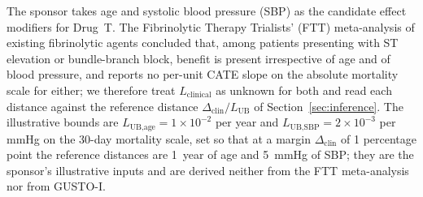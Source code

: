 \documentclass[AMA,Times1COL]{WileyNJDv5}
\begin{document}
The sponsor takes age and systolic blood pressure (SBP) as the candidate effect modifiers for Drug~T. The Fibrinolytic Therapy Trialists' (FTT) meta-analysis of existing fibrinolytic agents\cite{ftt1994} concluded that, among patients presenting with ST elevation or bundle-branch block, benefit is present irrespective of age and of blood pressure, and reports no per-unit CATE slope on the absolute mortality scale for either; we therefore treat $L_{\text{clinical}}$ as unknown for both and read each distance against the reference distance $\Delta_{\text{clin}} / L_{\text{UB}}$ of Section~\ref{sec:inference}. The illustrative bounds are $L_{\text{UB,age}} = 1 \times 10^{-2}$ per year and $L_{\text{UB,SBP}} = 2 \times 10^{-3}$ per mmHg on the 30-day mortality scale, set so that at a margin $\Delta_{\text{clin}}$ of 1 percentage point the reference distances are 1~year of age and 5~mmHg of SBP; they are the sponsor's illustrative inputs and are derived neither from the FTT meta-analysis nor from GUSTO-I.
\end{document}

